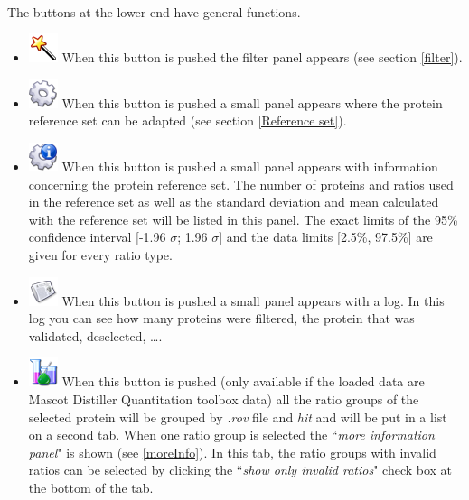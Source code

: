 \documentclass[11pt,a4paper,oneside,notitlepage]{book}
\begin{document}
\paragraph{}The buttons at the lower end have general functions.
\begin{itemize}
\item \includegraphics[scale=0.6, H]{wizard.png} When this button is pushed the filter panel appears (see section \ref{filter}).
\item \includegraphics[scale=0.6, H]{misc.png} When this button is pushed a small panel appears where the protein reference set can be adapted (see section \ref{Reference set}).
\item \includegraphics[scale=0.6, H]{misc_info.png} When this button is pushed a small panel appears with information concerning the protein reference set. The number of proteins and ratios used in the reference set as well as the standard deviation and mean calculated with the reference set will be listed in this panel. The exact limits of the 95\% confidence interval [-1.96 $\sigma$; 1.96 $\sigma$] and the data limits [2.5\%, 97.5\%] are given for every ratio type.
\item \includegraphics[scale=0.6, H]{log.png} When this button is pushed a small panel appears with a log. In this log you can see how many proteins were filtered, the protein that was validated, deselected, \ldots .
\item \includegraphics[scale=0.6, H]{edu_science.png} When this button is pushed (only available if the loaded data are Mascot Distiller Quantitation toolbox data) all the ratio groups of the selected protein will be grouped by \textit{.rov} file and \textit{hit} and will be put in a list on a second tab. When one ratio group is selected the ``\textit{more information panel}" is shown (see \ref{moreInfo}). In this tab, the ratio groups with invalid ratios can be selected by clicking the ``\textit{show only invalid ratios}" check box at the bottom of the tab.

\end{itemize}
\end{document}
